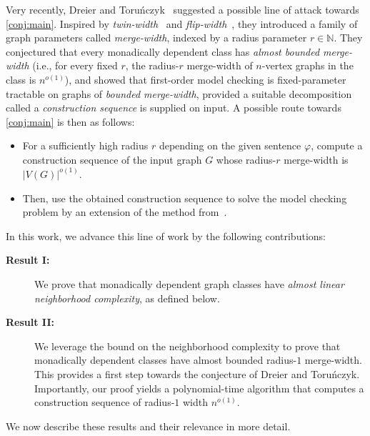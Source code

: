 \documentclass[11pt]{article}
\theoremstyle{definition}
\newcommand{\N}{\mathbb{N}}
\begin{document}
Very recently, Dreier and Toru\'nczyk~\cite{mw-mc} suggested a possible line of attack towards \cref{conj:main}. Inspired by \emph{twin-width}~\cite{twwI} and \emph{flip-width}~\cite{flipwidth}, they introduced a family of graph parameters called \emph{merge-width}, indexed by a radius parameter $r\in \N$. They conjectured that every monadically dependent class has \emph{almost bounded merge-width} (i.e., for every fixed $r$, the radius-$r$ merge-width of $n$-vertex graphs in the class is $n^{o(1)}$), and showed that first-order model checking is fixed-parameter tractable on graphs of \emph{bounded merge-width}, provided a suitable decomposition called a \emph{construction sequence} is supplied on input. A possible route towards \cref{conj:main} is then as follows:
\begin{itemize}
\item For a sufficiently high radius $r$ depending on the given sentence $\varphi$, compute a construction sequence of the input graph $G$ whose radius-$r$ merge-width is $|V(G)|^{o(1)}$.
\item Then, use the obtained construction sequence to solve the model checking problem by an extension of the method from~\cite{mw-mc}.
\end{itemize}
In this work, we advance this line of work by the following contributions:
\begin{description}%
	\item[\textbf{Result I:}] We prove that monadically dependent graph classes have \emph{almost linear neighborhood complexity}, as defined below.
	\item[\textbf{Result II:}] We leverage the bound on the neighborhood complexity to prove that monadically dependent classes have almost bounded radius-$1$ merge-width. This provides a first step towards the conjecture of Dreier and Toru\'nczyk. Importantly, our proof yields a polynomial-time algorithm that computes a construction sequence of radius-$1$ width $n^{o(1)}$.
\end{description}
We now describe these results and their relevance in more detail.
%
\end{document}
